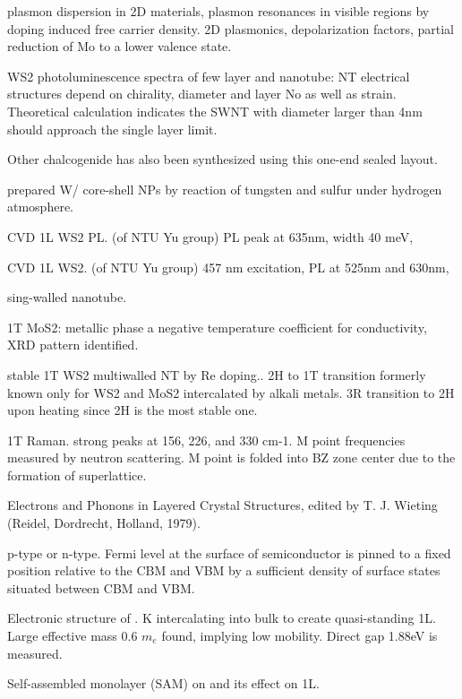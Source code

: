 plasmon dispersion in 2D materials, plasmon resonances in visible regions by doping induced free carrier density. 2D plasmonics, depolarization factors, partial reduction of Mo to a lower valence state. \cite{Alsaif2014a}

WS2 photoluminescence spectra of few layer and nanotube:
NT electrical structures depend on chirality, diameter and layer No as well as strain. Theoretical calculation indicates the SWNT with diameter larger than 4nm should approach the single layer limit.\cite{Ghorbani-Asl2013}

Other chalcogenide has also been synthesized using this one-end sealed layout.\cite{Mukherjee2013}

\citeauthor{Zou2007} prepared W/ core-shell NPs by reaction of tungsten and sulfur under hydrogen atmosphere.\cite{Zou2007}

CVD 1L WS2 PL.\cite{Peimyoo2013} (of NTU Yu group) PL peak at 635nm, width 40 meV, 

CVD 1L WS2.\cite{Cong2013} (of NTU Yu group) 457 nm excitation, PL at 525nm and 630nm, 

 sing-walled nanotube.\cite{Xiao2014}

1T MoS2: metallic phase a negative temperature coefficient for conductivity, XRD pattern identified. \cite{Wypych1992}

stable 1T WS2 multiwalled NT by Re doping.\cite{Enyashin2011}. 2H to 1T transition formerly known only for WS2 and MoS2 intercalated by alkali metals. 3R transition to 2H upon heating since 2H is the most stable one.

1T  Raman.\cite{Yang1991} strong peaks at 156, 226, and 330 cm-1. M point frequencies measured by neutron scattering. M point is folded into BZ zone center due to the formation of superlattice.

Electrons and Phonons in Layered Crystal Structures, edited by T. J. Wieting (Reidel, Dordrecht, Holland, 1979).

 p-type or n-type.  Fermi level at the surface of semiconductor is pinned to a fixed position relative to the CBM and VBM by a sufficient density of surface states situated between CBM and VBM. \cite{Baglio1983}

Electronic structure of .\cite{Eknapakul2014} K intercalating into bulk to create quasi-standing 1L. Large effective mass 0.6 $m_e$ found, implying low mobility. Direct gap 1.88eV is measured.

Self-assembled monolayer (SAM) on  and its effect on  1L.\cite{Najmaei2014}

